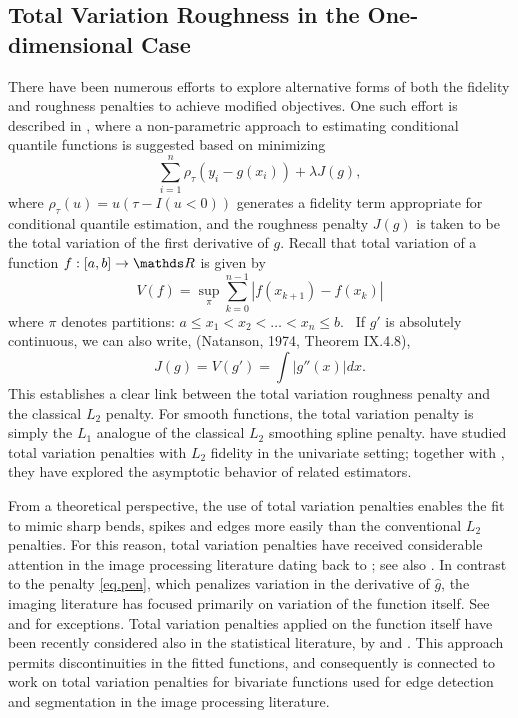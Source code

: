 \subsection{Total Variation Roughness in the One-dimensional Case}
There have been
numerous efforts to explore alternative forms of both the fidelity and
roughness penalties to achieve modified objectives. One such effort is
described in , where a non-parametric approach to
estimating conditional quantile functions is suggested based on minimizing
\begin{equation}
\label{eq:qss}
\sum_{i=1}^n \rho_\tau ( y_i - g(x_i) ) + \lambda J (g),
\end{equation}
where $\rho_\tau (u) = u ( \tau - I ( u < 0))$ generates a fidelity
term appropriate for conditional quantile estimation, and the
roughness penalty $J(g)$ is taken to be the total variation of the
first derivative of $g$.  
Recall that total variation of a function $f: [a,b] \rightarrow \RR$ is given by
\[
V(f) = \sup_\pi \sum_{k=0}^{n-1} | f(x_{k+1}) -f(x_k) |
\]
where $\pi$ denotes partitions: $a \leq x_1 < x_2 < \ldots < x_n \leq b$.
\
If $g'$ is absolutely continuous, we can also write, 
(Natanson, 1974, Theorem IX.4.8), \nocite {natanson}
\begin{equation}
\label{eq.pen}
J(g) = V (g') = \int |  g''(x)| dx.
\end{equation}
This establishes a clear link between the total variation roughness penalty 
and the classical $L_2$ penalty.
For smooth functions, the total variation penalty is simply the $L_1$
analogue of the classical $L_2$ smoothing spline penalty.
 have studied total variation penalties with $L_2$ fidelity
in the univariate setting; together with \citeasnoun{P.97}, 
they have explored the asymptotic behavior of related estimators.  


From a theoretical perspective, the use of total variation penalties 
enables the fit to mimic sharp bends, spikes and edges more easily than the
conventional $L_2$ penalties.  For this reason, total variation penalties
have received considerable attention in the image processing literature
dating back to \citeasnoun{ORF};  see also \citeasnoun{OR}.  
In contrast to the penalty \eqref{eq.pen},
which penalizes variation in the derivative of $\hat g$, the imaging
literature has focused primarily on variation of the function itself.
See \citeasnoun{TWBO} and \citeasnoun{Scherz98} for exceptions.
Total variation penalties applied on the function itself have been
recently considered also in the statistical literature, by 
and \citeasnoun{DK.01}. This approach permits discontinuities in
the fitted functions, and consequently is connected to
work on total variation penalties for bivariate functions
used for edge detection and segmentation in the image processing literature.  

